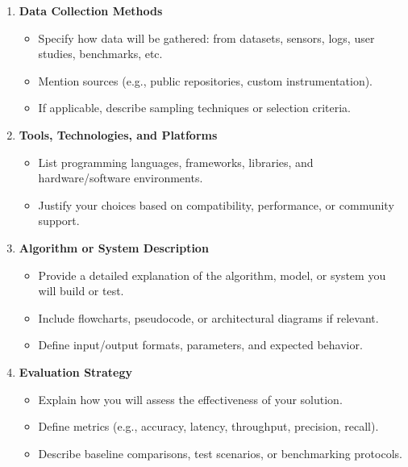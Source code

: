 \documentclass[PCOM,Proposal,Review]{mpThesis}
\newcommand{\Hd}[1]{{\color{SteelBlue}\bf#1}}
\begin{document}
\begin{MainMatter}
\begin{Remark}
\begin{enumerate}
\begin{itemize}
  \item Justify why this design is appropriate for your research problem.
  \end{itemize}

\item \Hd{Data Collection Methods}
  \begin{itemize}
  \item Specify how data will be gathered: from datasets, sensors, logs, user studies, benchmarks, etc.

  \item Mention sources (e.g., public repositories, custom instrumentation).

  \item If applicable, describe sampling techniques or selection criteria.
  \end{itemize}

\item \Hd{Tools, Technologies, and Platforms}
  \begin{itemize}
  \item List programming languages, frameworks, libraries, and hardware/software environments.

  \item Justify your choices based on compatibility, performance, or community support.
  \end{itemize}

\item \Hd{Algorithm or System Description}
  \begin{itemize}
  \item Provide a detailed explanation of the algorithm, model, or system you will build or test.

  \item Include flowcharts, pseudocode, or architectural diagrams if relevant.

  \item Define input/output formats, parameters, and expected behavior.
  \end{itemize}

\item \Hd{Evaluation Strategy}
  \begin{itemize}
  \item Explain how you will assess the effectiveness of your solution.

  \item Define metrics (e.g., accuracy, latency, throughput, precision, recall).

  \item Describe baseline comparisons, test scenarios, or benchmarking protocols.
  \end{itemize}


\end{enumerate}
\end{Remark}
\end{MainMatter}
\end{document}
